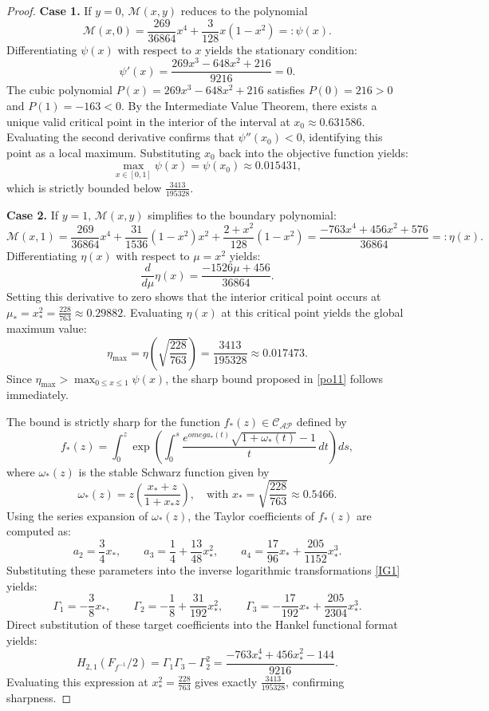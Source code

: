 \documentclass[10pt,a4paper]{amsart}
\numberwithin{equation}{section}
\begin{document}
\begin{proof}
\medskip
\noindent\textbf{Case 1.} If $y=0$, $\mathcal{M}(x,y)$ reduces to the polynomial
\[
\mathcal{M}(x,0) = \frac{269}{36864}x^4 +\frac{3}{128}x(1-x^2) =: \psi(x).
\]
Differentiating $\psi(x)$ with respect to $x$ yields the stationary condition:
\[
\psi'(x) = \frac{269x^3 - 648x^2 + 216}{9216} = 0.
\]
The cubic polynomial $P(x) = 269x^3 - 648x^2 + 216$ satisfies $P(0) = 216 > 0$ and $P(1) = -163 < 0$. By the Intermediate Value Theorem, there exists a unique valid critical point in the interior of the interval at $x_0 \approx 0.631586$. Evaluating the second derivative confirms that $\psi''(x_0) < 0$, identifying this point as a local maximum. Substituting $x_0$ back into the objective function yields:
\[
\max_{x \in [0,1]} \psi(x) = \psi(x_0) \approx 0.015431,
\]
which is strictly bounded below $\frac{3413}{195328}$.

\medskip
\noindent\textbf{Case 2.} If $y=1$, $\mathcal{M}(x,y)$ simplifies to the boundary polynomial:
\[
\mathcal{M}(x,1) = \frac{269}{36864}x^4 +\frac{31}{1536}(1-x^2)x^2 +\frac{2+x^2}{128}(1-x^2) = \frac{-763x^4+456x^2+576}{36864} =: \eta(x).
\]
Differentiating $\eta(x)$ with respect to $\mu = x^2$ yields:
\[
\frac{d}{d\mu}\eta(x) = \frac{-1526\mu+456}{36864}.
\]
Setting this derivative to zero shows that the interior critical point occurs at $\mu_* = x_*^2 = \frac{228}{763} \approx 0.29882$. Evaluating $\eta(x)$ at this critical point yields the global maximum value:
\[
\eta_{\max} = \eta\left(\sqrt{\frac{228}{763}}\right) = \frac{3413}{195328} \approx 0.017473.
\]
Since $\eta_{\max} > \max_{0\le x\le1}\psi(x)$, the sharp bound proposed in \eqref{po11} follows immediately.

The bound is strictly sharp for the function $f_*(z) \in \mathcal{C}_{\mathcal{AP}}$ defined by
\begin{equation}\label{ext_hankel}
f_*(z) = \int_0^z \exp \left( \int_0^s \frac{e^{omega_*(t)}\sqrt{1+\omega_*(t)} - 1}{t} \, dt \right) ds,
\end{equation}
where $\omega_*(z)$ is the stable Schwarz function given by
\[
\omega_*(z) = z \left( \frac{x_* + z}{1 + x_* z} \right), \quad \text{with } x_* = \sqrt{\frac{228}{763}} \approx 0.5466.
\]
Using the series expansion of $\omega_*(z)$, the Taylor coefficients of $f_*(z)$ are computed as:
\[
a_2 = \frac{3}{4}x_*, \qquad a_3 = \frac{1}{4} + \frac{13}{48}x_*^2, \qquad a_4 = \frac{17}{96}x_* + \frac{205}{1152}x_*^3.
\]
Substituting these parameters into the inverse logarithmic transformations \eqref{IG1} yields:
\[
\Gamma_1 = -\frac{3}{8}x_*, \qquad \Gamma_2 = -\frac{1}{8} + \frac{31}{192}x_*^2, \qquad \Gamma_3 = -\frac{17}{192}x_* + \frac{205}{2304}x_*^3.
\]
Direct substitution of these target coefficients into the Hankel functional format yields:
\[
H_{2,1}\left(F_{f^{-1}}/2\right) = \Gamma_1\Gamma_3 - \Gamma_2^2 = \frac{-763x_*^4 + 456x_*^2 - 144}{9216}.
\]
Evaluating this expression at $x_*^2 = \frac{228}{763}$ gives exactly $\frac{3413}{195328}$, confirming sharpness.
\end{proof}
\end{document}
